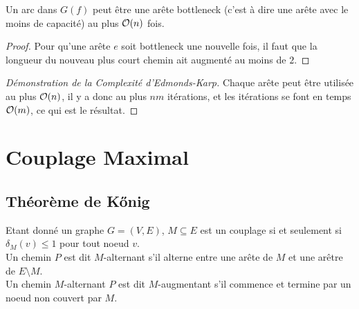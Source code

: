\documentclass[math, info]{cours}
\begin{document}
\begin{lemme}
	Un arc dans $G(f)$ peut être une arête bottleneck (c'est à dire une arête avec le moins de capacité) au plus $\mathcal{O}(n)$ fois.
\end{lemme}
\begin{proof}
	Pour qu'une arête $e$ soit bottleneck une nouvelle fois, il faut que la longueur du nouveau plus court chemin ait augmenté au moins de $2$.
\end{proof}


\begin{proof}[Démonstration de la Complexité d'Edmonds-Karp]
	Chaque arête peut être utilisée au plus $\mathcal{O}(n)$, il y a donc au plus $nm$ itérations, et les itérations se font en temps $\mathcal{O}(m)$, ce qui est le résultat.
\end{proof}

\section{Couplage Maximal}
\subsection{Théorème de K\H{o}nig}
\begin{definition}
	Etant donné un graphe $G = \left(V, E \right)$, $M \subseteq E$ est un couplage si et seulement si $\delta_{M}(v) \leq 1$ pour tout noeud $v$.\\
	Un chemin $P$ est dit $M$-alternant s'il alterne entre une arête de $M$ et une arêtre de $E\setminus M$. \\
	Un chemin $M$-alternant $P$ est dit $M$-augmentant s'il commence et termine par un noeud non couvert par $M$.
	\label{def:matching}
\end{definition}
\end{document}

